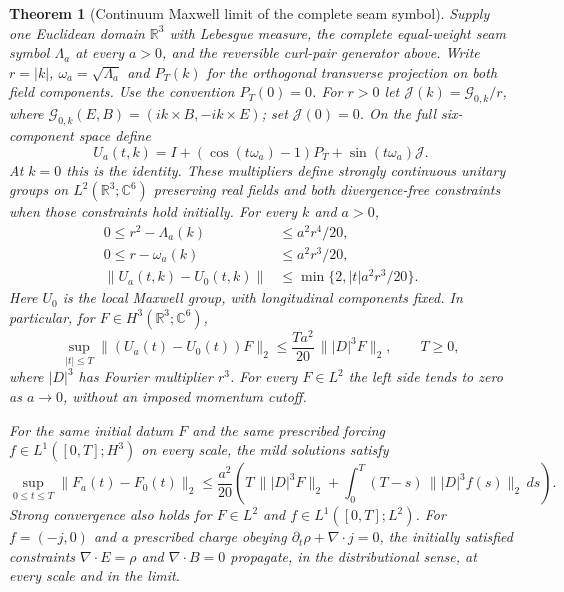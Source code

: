 \documentclass[11pt]{article}
\newtheorem{theorem}{Theorem}[section]
\theoremstyle{remark}
\theoremstyle{plain}
\begin{document}
\begin{theorem}[Continuum Maxwell limit of the complete seam symbol]
\label{thm:seam-maxwell-continuum}
Supply one Euclidean domain $\mathbb R^3$ with Lebesgue measure, the complete
equal-weight seam symbol $\Lambda_a$ at every $a>0$, and the reversible
curl-pair generator above. Write $r=|k|$, $\omega_a=\sqrt{\Lambda_a}$ and
$P_T(k)$ for the orthogonal transverse projection on both field components.
Use the convention $P_T(0)=0$. For $r>0$ let $\mathcal J(k)=\mathcal G_{0,k}/r$, where
$\mathcal G_{0,k}(E,B)=(ik\times B,-ik\times E)$; set $\mathcal J(0)=0$.
On the full six-component space define
\[
 U_a(t,k)=I+(\cos(t\omega_a)-1)P_T+\sin(t\omega_a)\mathcal J.
\]
At $k=0$ this is the identity. These multipliers define strongly continuous
unitary groups on $L^2(\mathbb R^3;\mathbb C^6)$ preserving real fields and
both divergence-free constraints when those constraints hold initially.
For every $k$ and $a>0$,
\begin{align}
 0\le r^2-\Lambda_a(k)&\le a^2r^4/20,\label{eq:seam-continuum-symbol}\\
 0\le r-\omega_a(k)&\le a^2r^3/20,\label{eq:seam-continuum-frequency}\\
 \|U_a(t,k)-U_0(t,k)\|&\le\min\{2,|t|a^2r^3/20\}.
 \label{eq:seam-continuum-propagator}
\end{align}
Here $U_0$ is the local Maxwell group, with longitudinal components fixed.
In particular, for $F\in H^3(\mathbb R^3;\mathbb C^6)$,
\[
 \sup_{|t|\le T}\|(U_a(t)-U_0(t))F\|_2
 \le \frac{Ta^2}{20}\,\||D|^3F\|_2,
 \qquad T\ge0,
\]
where $|D|^3$ has Fourier multiplier $r^3$. For every $F\in L^2$ the left
side tends to zero as $a\to0$, without an imposed momentum cutoff.

For the same initial datum $F$ and the same prescribed forcing
$f\in L^1([0,T];H^3)$ on every scale, the mild solutions satisfy
\[
 \sup_{0\le t\le T}\|F_a(t)-F_0(t)\|_2
 \le\frac{a^2}{20}\left(
 T\,\||D|^3F\|_2+
 \int_0^T(T-s)\,\||D|^3f(s)\|_2\,ds\right).
\]
Strong convergence also holds for $F\in L^2$ and $f\in L^1([0,T];L^2)$.
For $f=(-j,0)$ and a prescribed charge obeying
$\partial_t\rho+\nabla\cdot j=0$, the initially satisfied constraints
$\nabla\cdot E=\rho$ and $\nabla\cdot B=0$ propagate, in the distributional
sense, at every scale and in the limit.
\end{theorem}
\end{document}
